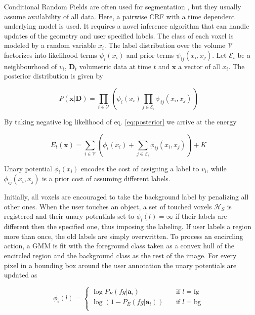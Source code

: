 \documentclass{llncs}
\begin{document}
 Conditional Random Fields are often used for segmentation \cite{VCRF}, but they usually assume availability of all data. Here, a pairwise CRF \cite{crf} with a time dependent underlying model is used. It requires a novel inference algorithm that can handle updates of the geometry and user specified labels. The class of each voxel is modeled by a random variable $x_i$. The label distribution over the volume $\mathcal{V}$ factorizes into likelihood terms $\psi_i(x_i)$ and prior terms $\psi_{ij}(x_i, x_j)$. Let $\mathcal{E}_i$ be a neighbourhood of $v_i$, $\mathbf{D}_t $ volumetric data at time $t$ and $\mathbf{x}$ a vector of all $x_i$. The posterior distribution is given by
 
  \begin{equation} \label{eq:posterior}
  P(\mathbf{x}|\mathbf{D}) = \prod_{i \in \mathcal{V}} \left( \psi_i(x_i) \prod_{j \in \mathcal{E}_i} \psi_{ij}(x_i, x_j) \right) 
  \end{equation}

  By taking negative log likelihood of eq. \ref{eq:posterior} we arrive at the energy

  \begin{equation} \label{eq:energy}
  E_t(\mathbf{x}) = \sum_{i \in \mathcal{V}} \left( \phi_i(x_i) + \sum_{j \in \mathcal{E}_i} \phi_{ij} (x_i, x_j) \right) + K
  \end{equation}

  Unary potential $\phi_i(x_i)$ encodes the cost of assigning a label to $v_i$, while $\phi_{ij}(x_i, x_j)$ is a prior cost of assuming different labels. 
  
  Initially, all voxels are encouraged to take the background label by penalizing all other ones. When the user touches an object, a set of touched voxels $\mathcal{H}_S$ is registered and their unary potentials set to $\phi_i(l) = \infty$ if their labels are different then the specified one, thus imposing the labeling. If user labels a region more than once, the old labels are simply overwritten. To process an encircling action, a GMM is fit with the foreground class taken as a convex hull of the encircled region and the background class as the rest of the image. For every pixel in a bounding box around the user annotation the unary potentials are updated as 

  \begin{equation}
  \phi_i(l) =
    \begin{cases}
      \log P_E(fg|\mathbf{a}_i)       & \quad \text{if } l = \text{fg}\\
      \log (1 - P_E(fg|\mathbf{a}_i))  & \quad \text{if } l = \text{bg}\\
    \end{cases}
  \end{equation}
\end{document}
